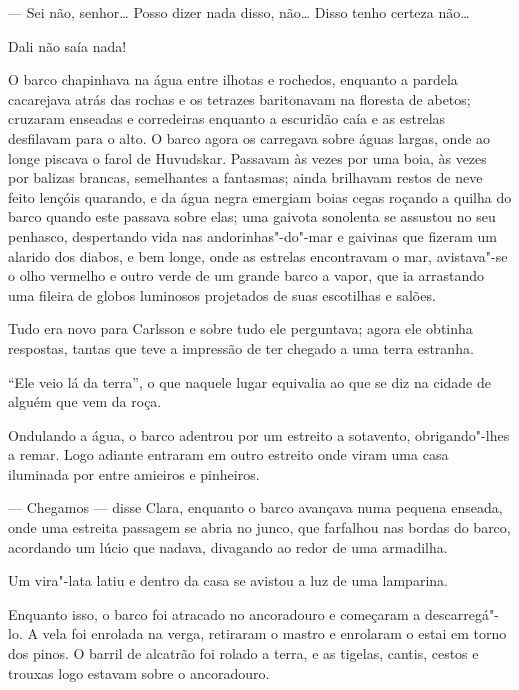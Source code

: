--- Sei não, senhor\ldots{} Posso dizer nada disso, não\ldots{} Disso tenho
certeza não\ldots{}

Dali não saía nada!

O barco chapinhava na água entre ilhotas e rochedos, enquanto a pardela cacarejava
atrás das rochas e os tetrazes baritonavam na floresta de abetos; cruzaram
enseadas e corredeiras enquanto a escuridão caía e as estrelas desfilavam para o
alto. O barco agora os carregava sobre águas largas, onde ao longe piscava o
farol de Huvudskar. Passavam às vezes por uma boia, às vezes por balizas
brancas, semelhantes a fantasmas; ainda brilhavam restos de neve feito lençóis quarando, 
e da água negra emergiam boias cegas roçando a quilha do barco quando
este passava sobre elas; uma gaivota sonolenta se assustou no seu penhasco,
despertando vida nas andorinhas"-do"-mar e gaivinas que fizeram um alarido dos
diabos, e bem longe, onde as estrelas encontravam o mar, avistava"-se o olho
vermelho e outro verde de um grande barco a vapor, que ia arrastando uma fileira
de globos luminosos projetados de suas escotilhas e salões.

Tudo era novo para Carlsson e sobre tudo ele perguntava; agora ele obtinha
respostas, tantas que teve a impressão de ter chegado a uma terra estranha.

 ``Ele veio lá da terra'', o que naquele lugar equivalia ao que se diz na cidade
 de alguém que vem da roça.

Ondulando a água, o barco adentrou por um estreito a sotavento, obrigando"-lhes
a remar. Logo adiante entraram em outro estreito onde viram uma casa iluminada
por entre amieiros e pinheiros.

--- Chegamos --- disse Clara, enquanto o barco avançava numa pequena
enseada, onde uma estreita passagem se abria no junco, que farfalhou nas bordas
do barco, acordando um lúcio que nadava, divagando ao redor de uma armadilha.

Um vira"-lata latiu e dentro da casa se avistou a luz de uma lamparina.

Enquanto isso, o barco foi atracado no ancoradouro e começaram a descarregá"-lo.
A vela foi enrolada na verga, retiraram o mastro e enrolaram o estai em torno
dos pinos. O barril de alcatrão foi rolado a terra, e as tigelas, cantis, cestos
e trouxas logo estavam sobre o ancoradouro.

